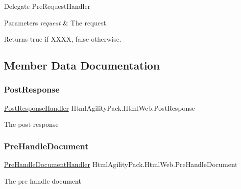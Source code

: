 Delegate Pre\+Request\+Handler 


\begin{DoxyParams}{Parameters}
{\em request} & The request.\\
\hline
\end{DoxyParams}
\begin{DoxyReturn}{Returns}
{\ttfamily true} if X\+X\+XX, {\ttfamily false} otherwise.
\end{DoxyReturn}


\subsection{Member Data Documentation}
\mbox{\label{class_html_agility_pack_1_1_html_web_a441d744d95ecd9fa8279d61001fa879c}} 
\subsubsection{\texorpdfstring{Post\+Response}{PostResponse}}
{\footnotesize\ttfamily \hyperlink{class_html_agility_pack_1_1_html_web_ad1e916ff2a7d0208601048ba15c2de45}{Post\+Response\+Handler} Html\+Agility\+Pack.\+Html\+Web.\+Post\+Response}



The post response 

\mbox{\label{class_html_agility_pack_1_1_html_web_afbfe4a399f07b040f11d279a83140e7c}} 
\subsubsection{\texorpdfstring{Pre\+Handle\+Document}{PreHandleDocument}}
{\footnotesize\ttfamily \hyperlink{class_html_agility_pack_1_1_html_web_a04fb9c8f6dd4672c86fcb4021008f64e}{Pre\+Handle\+Document\+Handler} Html\+Agility\+Pack.\+Html\+Web.\+Pre\+Handle\+Document}



The pre handle document 

